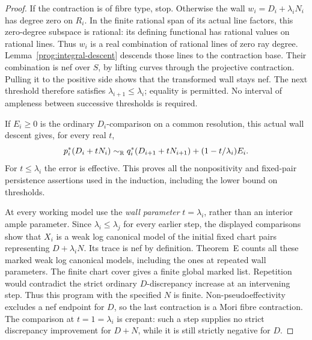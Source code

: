 \begin{proof}
If the contraction is of fibre type, stop. Otherwise the wall
\(w_i=D_i+\lambda_iN_i\) has degree zero on \(R_i\).
In the finite rational span of its actual line factors, this
zero-degree subspace is rational: its defining functional has
rational values on rational lines. Thus \(w_i\) is a real
combination of rational lines of zero ray degree.
Lemma~\ref{prog:integral-descent} descends those lines to the
contraction base. Their combination is nef over \(S\), by lifting
curves through the projective contraction. Pulling it to the
positive side shows that the transformed wall stays nef. The next
threshold therefore satisfies \(\lambda_{i+1}\leq\lambda_i\);
equality is permitted. No interval of ampleness between successive
thresholds is required.

If \(E_i\geq0\) is the ordinary \(D_i\)-comparison on a common
resolution, this actual wall descent gives, for every real \(t\),
\[
 p_i^*(D_i+tN_i)
 \sim_{\mathbb R}q_i^*(D_{i+1}+tN_{i+1})
                 +(1-t/\lambda_i)E_i.
\]
For \(t\leq\lambda_i\) the error is effective. This proves all
the nonpositivity and fixed-pair persistence assertions used in
the induction, including the lower bound on thresholds.

At every working model use the \emph{wall parameter} \(t=\lambda_i\),
rather than an interior ample parameter. Since
\(\lambda_i\leq\lambda_j\) for every earlier step, the displayed
comparisons show that \(X_i\) is a weak log canonical model of
the initial fixed chart pairs representing \(D+\lambda_iN\).
Its trace is nef by definition. Theorem~E counts all these marked
weak log canonical models, including the ones at repeated wall
parameters. The finite chart cover gives a finite global marked
list. Repetition would contradict the strict ordinary
\(D\)-discrepancy increase at an intervening step. Thus this
program with the specified \(N\) is finite. Non-pseudoeffectivity
excludes a nef endpoint for \(D\), so the last contraction is a
Mori fibre contraction. The comparison at \(t=1=\lambda_i\) is
crepant: such a step supplies no strict discrepancy improvement
for \(D+N\), while it is still strictly negative for \(D\).
\end{proof}
